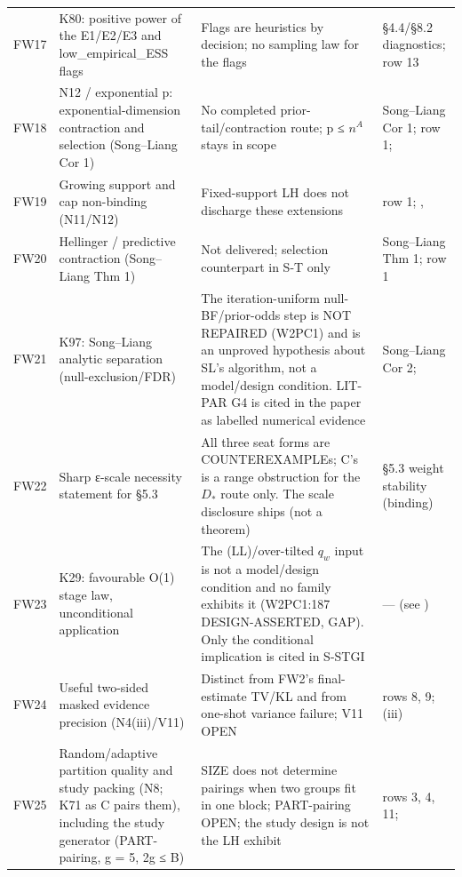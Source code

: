 {\begin{xltabular}{\textwidth}{@{}>{\raggedright\arraybackslash}p{1.25cm} >{\raggedright\arraybackslash}X >{\raggedright\arraybackslash}X >{\raggedright\arraybackslash}p{2.5cm}@{}}
 FW17 & K80: positive power of the E1/E2/E3 and low\_empirical\_ESS flags & Flags are heuristics by decision; no sampling law for the flags  & §4.4/§8.2 diagnostics; row 13 \\
 FW18 & N12 / exponential p: exponential-dimension contraction and selection (Song–Liang Cor 1) & No completed prior-tail/contraction route; p ≤ $n^A$ stays in scope  & Song–Liang Cor 1; row 1;  \\
 FW19 & Growing support and cap non-binding (N11/N12) & Fixed-support LH does not discharge these extensions  & row 1; ,  \\
 FW20 & Hellinger / predictive contraction (Song–Liang Thm 1) & Not delivered; selection counterpart in S-T only  & Song–Liang Thm 1; row 1 \\
 FW21 & K97: Song–Liang analytic separation (null-exclusion/FDR) & The iteration-uniform null-BF/prior-odds step is NOT REPAIRED (W2PC1) and is an unproved hypothesis about SL's algorithm, not a model/design condition. LIT-PAR G4 is cited in the paper as labelled numerical evidence  & Song–Liang Cor 2;  \\
 FW22 & Sharp ε-scale necessity statement for §5.3 & All three seat forms are COUNTEREXAMPLEs; C's is a range obstruction for the $D_*$ route only. The scale disclosure ships (not a theorem)  & §5.3 weight stability (binding) \\
 FW23 & K29: favourable O(1) stage law, unconditional application & The (LL)/over-tilted $q_w$ input is not a model/design condition and no family exhibits it (W2PC1:187 DESIGN-ASSERTED, GAP). Only the conditional implication is cited in S-STGI  & --- (see ) \\
 FW24 & Useful two-sided masked evidence precision (N4(iii)/V11) & Distinct from FW2's final-estimate TV/KL and from one-shot variance failure; V11 OPEN  & rows 8, 9; (iii) \\
 FW25 & Random/adaptive partition quality and study packing (N8; K71 as C pairs them), including the study generator (PART-pairing, g = 5, 2g ≤ B) & SIZE does not determine pairings when two groups fit in one block; PART-pairing OPEN; the study design is not the LH exhibit  & rows 3, 4, 11;  \\

\end{xltabular}}

